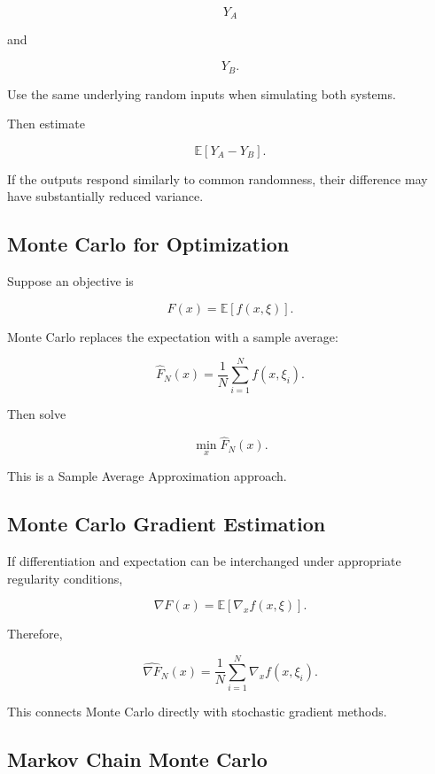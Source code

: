 \[
Y_A
\]

and

\[
Y_B.
\]

Use the same underlying random inputs when simulating both systems.

Then estimate

\[
\boxed{
\mathbb{E}
[
Y_A-Y_B
].
}
\]

If the outputs respond similarly to common randomness, their difference
may have substantially reduced variance.

\subsection{Monte Carlo for Optimization}
\label{subsec:monte-carlo-optimization}

Suppose an objective is

\[
\boxed{
F(x)
=
\mathbb{E}
[
f(x,\xi)
].
}
\]

Monte Carlo replaces the expectation with a sample average:

\[
\boxed{
\widehat{F}_N(x)
=
\frac1N
\sum_{i=1}^{N}
f(x,\xi_i).
}
\]

Then solve

\[
\boxed{
\min_x
\widehat{F}_N(x).
}
\]

This is a Sample Average Approximation approach.

\subsection{Monte Carlo Gradient Estimation}
\label{subsec:monte-carlo-gradients}

If differentiation and expectation can be interchanged under appropriate
regularity conditions,

\[
\boxed{
\nabla F(x)
=
\mathbb{E}
[
\nabla_x f(x,\xi)
].
}
\]

Therefore,

\[
\boxed{
\widehat{\nabla F}_N(x)
=
\frac1N
\sum_{i=1}^{N}
\nabla_x f(x,\xi_i).
}
\]

This connects Monte Carlo directly with stochastic gradient methods.

\subsection{Markov Chain Monte Carlo}
\label{subsec:markov-chain-monte-carlo}

